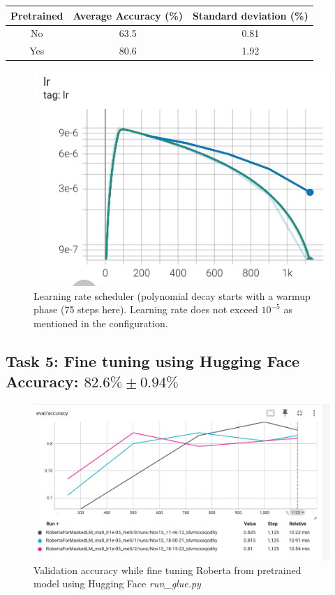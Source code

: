 \documentclass[a4paper]{article}
\begin{document}
\begin{center}
    \begin{tabular}{||c c c |} 
     \hline
     Pretrained & Average Accuracy (\%)  & Standard deviation  (\%)\\ [0.5ex] 
     \hline\hline
     No & 63.5  & 0.81\\ 
     \hline
     Yes & 80.6  & 1.92\\
     \hline
    \end{tabular}
\end{center}


\begin{figure}[ht]
    \centering
    \includegraphics[width=.6\textwidth]{figures/lr_curves.png}
    \caption{Learning rate scheduler (polynomial decay starts with a warmup phase (75 steps here). Learning rate does not exceed $10^{-5}$ as mentioned in the configuration.}
    \label{fig:lr}
\end{figure}

\break

\subsection*{Task 5: Fine tuning using Hugging Face \\ Accuracy: $82.6\%\pm0.94\%$}

\begin{figure}[ht]
    \centering
    \includegraphics[width=.8\textwidth]{figures/training_roberta_hugging_face.png}
    \caption{Validation accuracy while fine tuning Roberta from pretrained model using Hugging Face \textit{run\_glue.py}}
    \label{fig:roberta_hf}
\end{figure}
\end{document}
